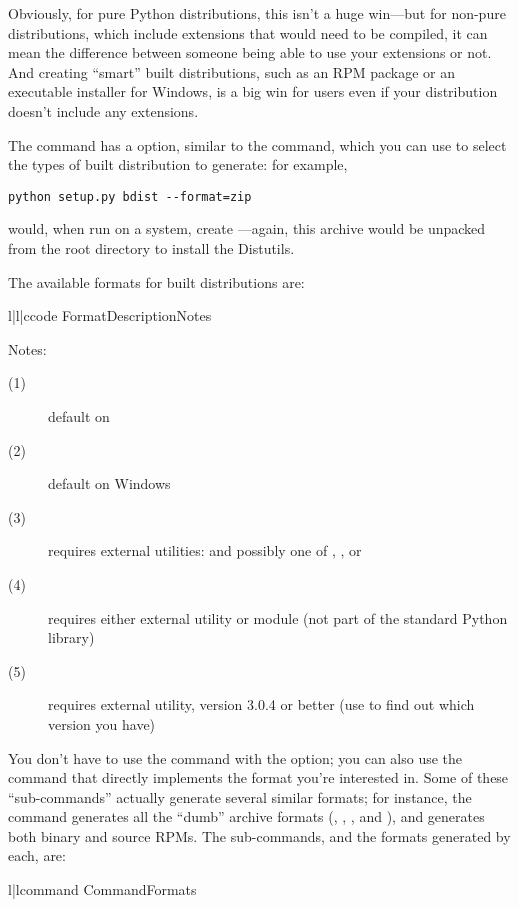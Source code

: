\documentclass{howto}
\begin{document}
Obviously, for pure Python distributions, this isn't a huge win---but
for non-pure distributions, which include extensions that would need to
be compiled, it can mean the difference between someone being able to
use your extensions or not.  And creating ``smart'' built distributions,
such as an RPM package or an executable installer for Windows, is a big
win for users even if your distribution doesn't include any extensions.

The  command has a  option,
similar to the  command, which you can use to select the
types of built distribution to generate: for example,
\begin{verbatim}
python setup.py bdist --format=zip
\end{verbatim}
would, when run on a \UNIX{} system, create
---again, this archive would be
unpacked from the root directory to install the Distutils.

The available formats for built distributions are:
\begin{tableiii}{l|l|c}{code}%
  {Format}{Description}{Notes}
\end{tableiii}

\noindent Notes:
\begin{description}
\item[(1)] default on \UNIX
\item[(2)] default on Windows 
\item[(3)] requires external utilities:  and possibly one
  of , , or 
\item[(4)] requires either external  utility or
   module (not part of the standard Python library)
\item[(5)] requires external  utility, version 3.0.4 or
  better (use  to find out which version you have)
\end{description}

You don't have to use the  command with the
 option; you can also use the command that
directly implements the format you're interested in.  Some of these
 ``sub-commands'' actually generate several similar
formats; for instance, the  command generates all
the ``dumb'' archive formats (, , , and
), and  generates both binary and source
RPMs.  The  sub-commands, and the formats generated by
each, are:
\begin{tableii}{l|l}{command}%
  {Command}{Formats}
\end{tableii}
\end{document}
